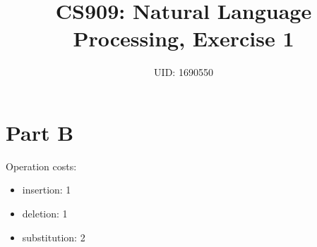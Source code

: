 \documentclass[11pt,journal]{article}
\begin{document}
	\title{CS909: Natural Language Processing, Exercise 1}
	
	\author{UID: 1690550}%
	



	
	
	\maketitle
	
	
	
	
	\section{Part B}
	Operation costs:
	\begin{itemize}
		\item insertion: 1
		\item deletion: 1
		\item substitution: 2
	\end{itemize}
\end{document}
